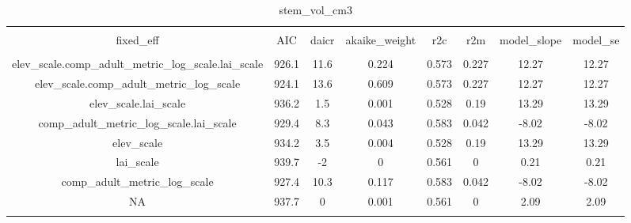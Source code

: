 
\begin{table}[!htbp] \centering 
  \caption{stem_vol_cm3} 
  \label{stem_vol_cm3} 
\begin{tabular}{@{\extracolsep{5pt}} cccccccc} 
\\[-1.8ex]\hline 
\hline \\[-1.8ex] 
fixed\_eff & AIC & daicr & akaike\_weight & r2c & r2m & model\_slope & model\_se \\ 
\hline \\[-1.8ex] 
elev\_scale.comp\_adult\_metric\_log\_scale.lai\_scale & 926.1 & 11.6 & 0.224 & 0.573 & 0.227 & 12.27 & 12.27 \\ 
elev\_scale.comp\_adult\_metric\_log\_scale & 924.1 & 13.6 & 0.609 & 0.573 & 0.227 & 12.27 & 12.27 \\ 
elev\_scale.lai\_scale & 936.2 & 1.5 & 0.001 & 0.528 & 0.19 & 13.29 & 13.29 \\ 
comp\_adult\_metric\_log\_scale.lai\_scale & 929.4 & 8.3 & 0.043 & 0.583 & 0.042 & -8.02 & -8.02 \\ 
elev\_scale & 934.2 & 3.5 & 0.004 & 0.528 & 0.19 & 13.29 & 13.29 \\ 
lai\_scale & 939.7 & -2 & 0 & 0.561 & 0 & 0.21 & 0.21 \\ 
comp\_adult\_metric\_log\_scale & 927.4 & 10.3 & 0.117 & 0.583 & 0.042 & -8.02 & -8.02 \\ 
NA & 937.7 & 0 & 0.001 & 0.561 & 0 & 2.09 & 2.09 \\ 
\hline \\[-1.8ex] 
\end{tabular} 
\end{table} 
